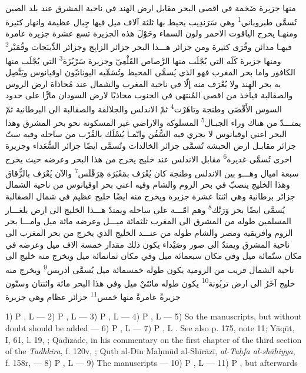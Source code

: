 \documentclass[11pt]{article}
\newcommand{\Pg}[1]{\marginpar{\footnotesize\color{gray}#1}}
\begin{document}
\Pg{I 174}\par\begin{Arabic}\ArNote منها جزيرة ضَخمة في اقصى البحر مقابل ارض الهند في ناحية المشرق عند بلد الصين تُسمَّى طبروباني\textsuperscript{1} وهي سَرَندِيب يحيط بها ثلثة آلاف ميل فيها جِبال عظيمة وانهار كثيرة ومنهـا يخرج الياقوت الاحمر ولون السماء وحَوْلَ هذه الجزيرة تسع عشرة جزيرة عامرة فيهـا مدائن وقُرَى كثيرة ومن جزائر هـــذا البحر جزائر الزابِج وجزائر الدِّيبَجات وقُمَيْر\textsuperscript{2} ومنها جزيرة كَلَه التي يُجْلَب منها الرَّصاص القَلْعِيّ وجزيرة سَرْبُزَة\textsuperscript{3} التي يُجْلَب منها الكافور واما بحر المغرب فهو الذي يُسمَّى المحيط وتُسَمِّيه اليونانيّون اوقيانوس ويَتَّصِل به بحر الهند ولا يُعْرَف منه إلّا في ناحية المغرب والشمال عند مُحاذاة ارض الروس والصقالبة فيأخذ من اقصى المُنتهَى في الجنوب محاذيًا لارض السودان مارًّا على حدود السوس الأَقْصَى وطنجة وتاهَرْت\textsuperscript{4} ثمّ الاندلس والجلالقة والصقالبة الى البرطانية ثمّ يمتـــدّ من هناك وراء الجبـال\textsuperscript{5} المسلوكة والاراضي غير المسكونة نحو بحر المشرق وهذا البحر اعني اوقيانوس لا يجري فيه السُّفُن وانّمـا يُسْلَك بالقُرْب من ساحله وفيه ستّ جزائر مقابـل ارض الحبشة تُسمَّى جزائر الخالدات وتُسمَّى ايضًا جزائر السُّعَداء وجزيرة اخرى تُسمَّى غديرة\textsuperscript{6} مقابل الاندلس عند خليج يخرج من هذا البحر وعرضه حيث يخرج سبعة اميال وهـــو بين الاندلس وطنجة كان يُعْرَف بمَعْبَرَة هِرَقْلَس\textsuperscript{7} والآن يُعْرَف بالزُّقاق وهذا الخليج ينصبّ في بحر الروم والشام وفيه اعني بحر اوقيانوس من ناحية الشمال جزائر برطانية وهي اثنتا عشرة جزيرة ويخرج منه ايضًا خليج عظيم في شمال الصقالبة يُسمَّى ايضًا بحر وَرَنْك\textsuperscript{8} وهم امّـــة على ساحله ويمتدّ هـــذا الخليج الى ارض بلغـــار المسلمين طوله من المشرق الى المغرب ثلثمائة ميـــل وعرضه مائة ميل وامـــا بحر الروم وافريقية ومصر والشام طوله من عنـــد الخليج الذي يخرج من بحر المغرب الى ناحية المشرق ويمتدّ الى صور وصَيْداء يكون ذلك مقدار خمسة الاف ميل وعرضه في مكان ستّمائة ميل وفي مكان سبعمائة ميل وفي مكان ثمانمائة ميل ويخرج منه خليج الى ناحية الشمال قريب من الرومية يكون طوله خمسمائة ميل يُسمَّى اذريس\textsuperscript{9} ويخرج منه خليج آخَرُ الى ارض تربُونة\textsuperscript{10} يكون طوله مائتَيْ ميل وفي هذا البحر مائة واثنتان وستّون جزيرةً عامرةً منها خمس\textsuperscript{11} جزائر عظام وهي جزيرة\end{Arabic}\par
\par 1) P , L  — 2) P , L  — 3) P , L  — 4) P , L  — 5) So the manuscripts, but without doubt  should be added — 6) P , L  — 7) P , L . See also p. 175, note 11; Yāqūt, I, 61, l. 19, ; Qāḍīzāde, in his commentary on the first chapter of the third section of the \emph{Tadhkira}, f. 120v, ; Quṭb al-Dīn Maḥmūd al-Shīrāzī, \emph{al-Tuḥfa al-shāhiyya}, f. 158r,  — 8) P , L  — 9) The manuscripts  — 10) P , L  — 11) P , but afterwards \par
\end{document}
